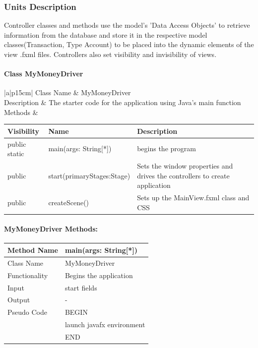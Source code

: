 \documentclass[12pt]{article}
\begin{document}
\subsubsection{Units Description}
Controller classes and methods use the model's 'Data Access Objects' to retrieve information from the database and store it in the respective model classes(Transaction, Type Account) to be placed into the dynamic elements of the view .fxml files. Controllers also set visibility and invisibility of views.
\paragraph{Class MyMoneyDriver}
\begin{table}[H]
	\begin{tabular}{|a|p{15cm}|}
		\hline
		{Class Name} & {MyMoneyDriver} \\
		\hline
		Description & The starter code for the application using Java's main function\\
		\hline
		Methods & 		 
		\begin{tabular}{| p{2cm} | p{5cm} | p{6.9cm} |}
			\hline
			\rowcolor{gray}
			{Visibility} &{Name} & {Description} \\
			\hline
			\rowcolor{white}			
			public static & main(args: String[*])  & begins the program\\
			\hline
			public & start(primaryStages:Stage)  & Sets the window properties and drives the controllers to create application \\
			\hline
			public & createScene() & Sets up the MainView.fxml class and CSS\\
			\hline			
		\end{tabular}								 
	\end{tabular}
\end{table}

\paragraph{MyMoneyDriver Methods:}

\begin{tabular}{ |p{3cm}||p{\colWidth}|  }
	\hline
	Method Name &  main(args: String[*]) \\
	\hline
	Class Name & MyMoneyDriver\\
	\hline
	Functionality & Begins the application\\
	\hline
	Input & start fields\\
	\hline
	Output & -\\
	\hline
	Pseudo Code&BEGIN\\ & launch javafx environment\\&END\\
	\hline
\end{tabular}  
\end{document}
